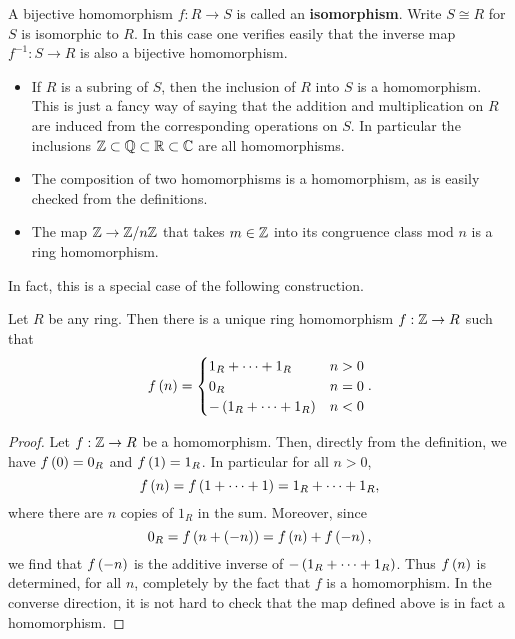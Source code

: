 \begin{definition}
A bijective homomorphism $ f : R \to S $ is called an \textbf{isomorphism}. Write $ S \cong R $ for $ S $ is isomorphic to $ R $. In this case one verifies easily that the inverse map $ f^{-1} : S \to R $ is also a bijective homomorphism.
\end{definition}

\begin{example2}
\hfill
\begin{itemize}
\item If $ R $ is a subring of $ S $, then the inclusion of $ R $ into $ S $ is a homomorphism. This is just a fancy way of saying that the addition and multiplication on $ R $ are induced from the corresponding operations on $ S $. In particular the inclusions $ \mathbb{Z} \subset \mathbb{Q} \subset \mathbb{R} \subset \mathbb{C} $ are all homomorphisms.
\item The composition of two homomorphisms is a homomorphism, as is easily checked from the definitions.
\item The map $ \mathbb{Z} \to \mathbb{Z} / n\mathbb{Z} $ that takes $ m \in \mathbb{Z} $ into its congruence class mod $ n $ is a ring homomorphism.
\end{itemize}
\end{example2}

In fact, this is a special case of the following construction.

\begin{proposition}
Let $ R $ be any ring. Then there is a unique ring homomorphism $ f : \mathbb{Z} \to R $ such that
$$ f\left( n \right) = \begin{cases}
1_R + \dots + 1_R & n > 0 \\
0_R & n = 0 \\
-\left( 1_R + \dots + 1_R \right) & n < 0
\end{cases}. $$
\end{proposition}

\begin{proof}
Let $ f : \mathbb{Z} \to R $ be a homomorphism. Then, directly from the definition, we have $ f\left( 0 \right) = 0_R $ and $ f\left( 1 \right) = 1_R $. In particular for all $ n > 0 $,
$$ f\left( n \right) = f\left( 1 + \dots + 1 \right) = 1_R + \dots + 1_R, $$
where there are $ n $ copies of $ 1_R $ in the sum. Moreover, since
$$ 0_R = f\left( n + \left( -n \right) \right) = f\left( n \right) + f\left( -n \right), $$
we find that $ f\left( -n \right) $ is the additive inverse of $ -\left( 1_R + \dots + 1_R \right) $. Thus $ f\left( n \right) $ is determined, for all $ n $, completely by the fact that $ f $ is a homomorphism. In the converse direction, it is not hard to check that the map defined above is in fact a homomorphism.
\end{proof}

